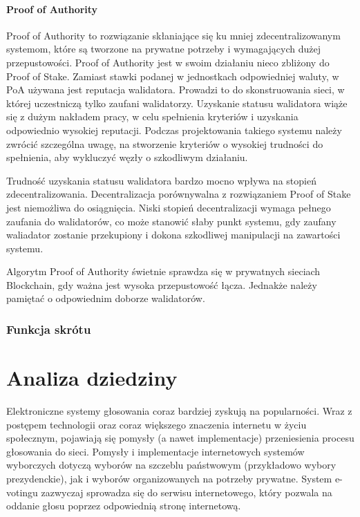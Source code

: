 \documentclass[a4paper,13pt]{report}
\begin{document}
\subsubsection{Proof of Authority}
Proof of Authority to rozwiązanie skłaniające się ku mniej zdecentralizowanym systemom, które są tworzone na prywatne potrzeby i wymagających dużej przepustowości. Proof of Authority jest w swoim działaniu nieco zbliżony do Proof of Stake. Zamiast stawki podanej w jednostkach odpowiedniej waluty, w PoA używana jest reputacja walidatora. Prowadzi to do skonstruowania sieci, w której uczestniczą tylko zaufani walidatorzy. Uzyskanie statusu walidatora wiąże się z dużym nakładem pracy, w celu spełnienia kryteriów i uzyskania odpowiednio wysokiej reputacji. Podczas projektowania takiego systemu należy zwrócić szczególna uwagę, na stworzenie kryteriów o wysokiej trudności do spełnienia, aby wykluczyć węzły o szkodliwym działaniu.

Trudność uzyskania statusu walidatora bardzo mocno wpływa na stopień zdecentralizowania. Decentralizacja porównywalna z rozwiązaniem Proof of Stake jest niemożliwa do osiągnięcia.
Niski stopień decentralizacji wymaga pełnego zaufania do walidatorów, co może stanowić słaby punkt systemu, gdy zaufany waliadator zostanie przekupiony i dokona szkodliwej manipulacji na zawartości systemu.

Algorytm Proof of Authority świetnie sprawdza się w prywatnych sieciach Blockchain, gdy ważna jest wysoka przepustowość łącza. Jednakże należy pamiętać o odpowiednim doborze walidatorów.

\subsection{Funkcja skrótu}

\newpage
\chapter{Analiza dziedziny}
Elektroniczne systemy głosowania coraz bardziej zyskują na popularności.
Wraz z postępem technologii oraz coraz większego znaczenia internetu w życiu 
społecznym, pojawiają się pomysły (a nawet implementacje) przeniesienia procesu głosowania do sieci. Pomysły i implementacje internetowych systemów wyborczych dotyczą wyborów na szczeblu państwowym (przykładowo wybory prezydenckie), jak i wyborów organizowanych na potrzeby prywatne. System e-votingu zazwyczaj sprowadza się do serwisu internetowego, który pozwala na oddanie głosu poprzez odpowiednią stronę internetową. 
\end{document}
